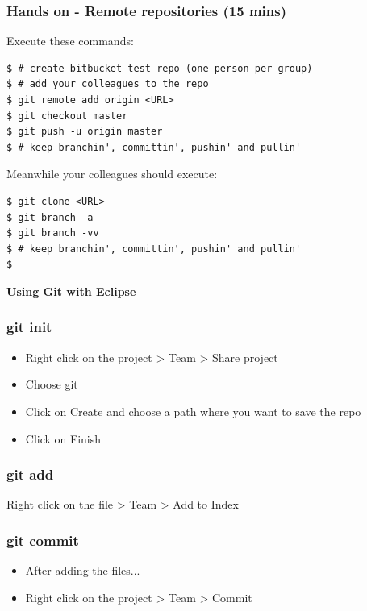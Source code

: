 \documentclass{beamer}
\begin{document}
\begin{frame}[fragile]
\frametitle{Hands on - Remote repositories (15 mins)}

Execute these commands:

\begin{lstlisting}
$ # create bitbucket test repo (one person per group)
$ # add your colleagues to the repo
$ git remote add origin <URL>
$ git checkout master
$ git push -u origin master
$ # keep branchin', committin', pushin' and pullin'
\end{lstlisting}

Meanwhile your colleagues should execute:

\begin{lstlisting}
$ git clone <URL>
$ git branch -a
$ git branch -vv
$ # keep branchin', committin', pushin' and pullin'
$ 
\end{lstlisting}


\end{frame}


\begin{frame}
\LARGE	
\textbf{Using Git with Eclipse}
\end{frame}


\begin{frame}
\frametitle{git init}

\begin{itemize}
\item Right click on the project > Team > Share project
\item Choose git 
\item Click on Create and choose a path where you want to save the repo
\item Click on Finish
\end{itemize}

\end{frame}

\begin{frame}
\frametitle{git add}

Right click on the file > Team > Add to Index

\end{frame}

\begin{frame}
\frametitle{git commit}


\begin{itemize}
\item After adding the files...

\item Right click on the project > Team > Commit

\end{itemize}
\end{frame}
\end{document}
